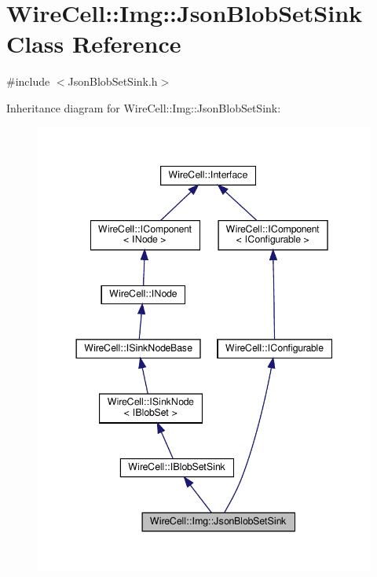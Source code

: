\hypertarget{class_wire_cell_1_1_img_1_1_json_blob_set_sink}{}\section{Wire\+Cell\+:\+:Img\+:\+:Json\+Blob\+Set\+Sink Class Reference}
\label{class_wire_cell_1_1_img_1_1_json_blob_set_sink}


{\ttfamily \#include $<$Json\+Blob\+Set\+Sink.\+h$>$}



Inheritance diagram for Wire\+Cell\+:\+:Img\+:\+:Json\+Blob\+Set\+Sink\+:
\nopagebreak
\begin{figure}[H]
\begin{center}
\leavevmode
\includegraphics[width=344pt]{class_wire_cell_1_1_img_1_1_json_blob_set_sink__inherit__graph}
\end{center}
\end{figure}


